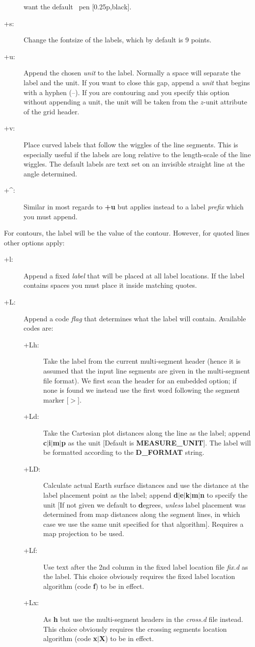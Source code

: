 \begin{description}
want the default \GMT\ pen [0.25p,black].
\item [+s:] Change the fontsize of the labels, which by default is 9 points.
\item [+u:] Append the chosen {\it unit} to the label.  Normally a space will separate the label
and the unit.  If you want to close this gap, append a {\it unit} that begins with a hyphen (--).
If you are contouring and you specify this option without appending a unit, the unit will be taken from the
$z$-unit attribute of the grid header.
\item [+v:]  Place curved labels that follow the wiggles of the line segments.  This is especially
useful if the labels are long relative to the length-scale of the line wiggles.  The default labels
are text set on an invisible straight line at the angle determined.
\item [+^:]  Similar in most regards to {\bf +u} but applies instead to a label \emph{prefix} which
you must append.
\end{description}
For contours, the label will be the value of the contour.  However, for quoted lines other
options apply:
\begin{description}
\item [+l:] Append a fixed {\it label} that will be placed at all label locations.  If the label contains
spaces you must place it inside matching quotes.
\item [+L:] Append a code {\it flag} that determines what the label will contain.  Available codes are:
\begin{description}
\item [+Lh:]  Take the label from the current multi-segment header (hence it is assumed that the
input line segments are given in the multi-segment file format).  We first scan the header for an embedded
 option; if none is found we instead use the first word following the segment marker [$>$].
\item [+Ld:] Take the Cartesian plot distances along the line as the label; append {\bf c$|$i$|$m$|$p}
as the unit [Default is {\bf MEASURE\_UNIT}].  The label will be formatted according to the {\bf D\_FORMAT}
string.
\item [+LD:]  Calculate actual Earth surface distances and use the distance at the label placement point as
the label; append {\bf d$|$e$|$k$|$m$|$n} to specify the unit [If not given we default to {\bf d}egrees,
\emph{unless} label placement was determined from map distances along the segment lines, in which case we
use the same unit specified for that algorithm].  Requires a map projection to be used.
\item [+Lf:]  Use text after the 2nd column in the fixed label location file {\it fix.d} as the label.
This choice obviously requires the fixed label location algorithm (code {\bf f}) to be in effect.
\item [+Lx:]  As {\bf h} but use the multi-segment headers in the {\it cross.d} file instead.
This choice obviously requires the crossing segments location algorithm (code {\bf x$|$X}) to be in effect.
\end{description}
\end{description}

